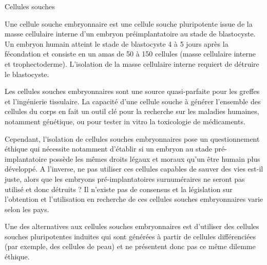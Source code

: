Cellules souches

Une cellule souche embryonnaire est une cellule souche pluripotente issue de la
masse cellulaire interne d’un embryon préimplantatoire au stade de blastocyste.
Un embryon humain atteint le stade de blastocyste 4 à 5 jours après la fécondation
et consiste en un amas de 50 à 150 cellules (masse cellulaire interne et
trophectoderme). L'isolation de la masse cellulaire interne requiert de détruire
le blastocyste.

Les cellules souches embryonnaires sont une source quasi-parfaite pour les greffes
et l'ingénierie tissulaire. La capacité d'une cellule souche à générer l'ensemble
des cellules du corps en fait un outil clé pour la recherche sur les maladies
humaines, notamment génétique, ou pour tester in vitro la toxicologie de médicaments.

Cependant, l'isolation de cellules souches embryonnaires pose un questionnement
éthique qui nécessite notamment d'établir si un embryon au stade pré-implantatoire
possède les mêmes droits légaux et moraux qu'un être humain plus développé. A
l'inverse, ne pas utiliser ces cellules capables de sauver des vies est-il juste,
alors que les embryons pré-implantatoires surnuméraires ne seront pas utilisé et
donc détruits ? Il n'existe pas de consensus et la législation sur l'obtention et
l'utilisation en recherche de ces cellules souches embryonnaires varie selon les pays.

Une des alternatives aux cellules souches embryonnaires est d'utiliser des cellules
souches pluripotentes induites qui sont générées à partir de cellules différenciées
(par exemple, des cellules de peau) et ne présentent donc pas ce même dilemme éthique.

